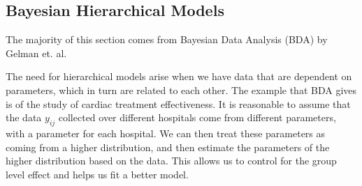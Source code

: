 \subsection{Bayesian Hierarchical Models}

The majority of this section comes from Bayesian Data Analysis (BDA) by Gelman et. al.

The need for hierarchical models arise when we have data that are dependent on parameters, which in turn are related to each other. The example that BDA gives is of the study of cardiac treatment effectiveness. It is reasonable to assume that the data $y_{ij}$ collected over different hospitals come from different parameters, with a parameter for each hospital. We can then treat these parameters as coming from a higher distribution, and then estimate the parameters of the higher distribution based on the data. This allows us to control for the group level effect and helps us fit a better model.

 